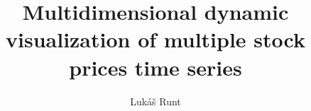 \documentclass[final,3p,times,twocolumn]{elsarticle}
\begin{document}
    
\begin{frontmatter}
        

        


\title{Multidimensional dynamic visualization of multiple stock prices time series}     

\author[KIV]{Lukáš Runt}


\address[KIV]{Student of Software and Information Systems, Department of Computer Science and Engineering, Faculty of Applied Sciences, University of West Bohemia, Pilsen, Czechia}

\begin{abstract}


\end{abstract}
\end{frontmatter}
\end{document}
